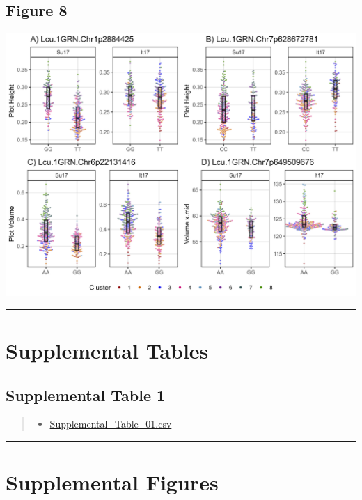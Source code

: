 \documentclass[
]{article}
\providecommand{\tightlist}{%
  \setlength{\itemsep}{0pt}\setlength{\parskip}{0pt}}
\begin{document}
\subsection{Figure 8}\label{figure-8}

\includegraphics{Figure_08.png}

\begin{center}\rule{0.5\linewidth}{0.5pt}\end{center}

\section{Supplemental Tables}\label{supplemental-tables}

\subsection{Supplemental Table 1}\label{supplemental-table-1}

\begin{quote}
\begin{itemize}
\tightlist
\item
  \href{https://github.com/derekmichaelwright/AGILE_LDP_UAV/blob/master/Supplemental_Table_01.csv}{Supplemental\_Table\_01.csv}
\end{itemize}
\end{quote}

\begin{center}\rule{0.5\linewidth}{0.5pt}\end{center}

\section{Supplemental Figures}\label{supplemental-figures}
\end{document}

